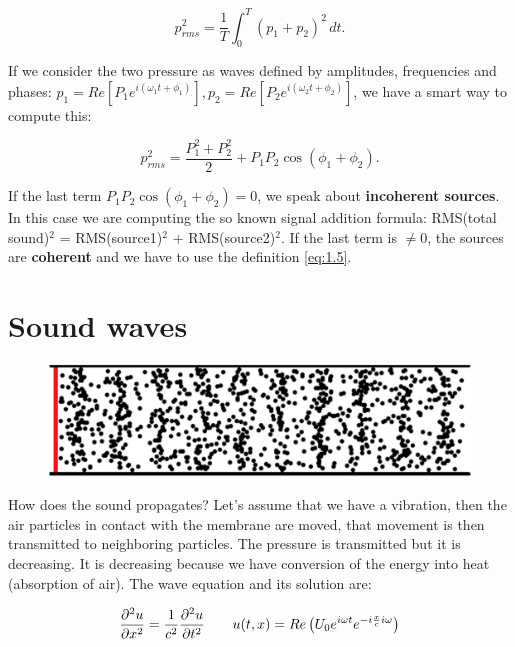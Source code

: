 	\begin{equation}
	p_{rms}^2 =\frac{1}{T} \int _0^T (p_1 + p_2)^2 \, dt. 
	\end{equation}
	
	If we consider the two pressure as waves defined by amplitudes, frequencies and phases: $p_1 = Re[P_1 e^{i(\omega _1 t + \phi _1)}], p_2 = Re[P_2 e^{i(\omega _2 t + \phi _2)}]$, we have a smart way to compute this:
	
	\begin{equation}
	p_{rms}^2 = \frac{P_1^2 + P_2^2}{2} + P_1 P_2 \cos (\phi _1 + \phi _2).
	\label{eq:1.5}
	\end{equation}
	
	If the last term $P_1 P_2 \cos (\phi _1 + \phi _2) = 0$, we speak about \textbf{incoherent sources}. In this case we are computing the so known signal addition formula: RMS(total sound)$^2$ = RMS(source1)$^2$ + RMS(source2)$^2$. If the last term is $\neq 0$, the sources are \textbf{coherent} and we have to use the definition \eqref{eq:1.5}.
	
\section{Sound waves}
	\begin{figure}
	\vspace{-5mm}
	\includegraphics[scale=0.18]{acoustics/ch1/5}
	\label{fig:1.5}
	\end{figure}
	How does the sound propagates? Let's assume that we have a vibration, then the air particles in contact with the membrane are moved, that movement is then transmitted to neighboring particles. The pressure is transmitted but it is decreasing. It is decreasing because we have conversion of the energy into heat (absorption of air). The wave equation and its solution are: 
	
	\begin{equation}
	\frac{\partial ^2 u}{\partial x^2} = \frac{1}{c^2} \frac{\partial ^2 u}{\partial t^2} \qquad u(t,x) = Re\left( U_0 e^{i\omega t} e^{-i\frac{x}{c}i\omega} \right)
	\end{equation}
	
